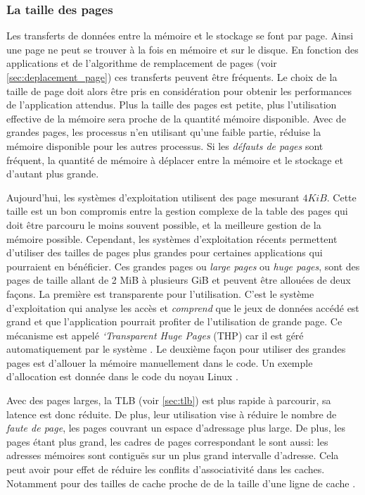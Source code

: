 \subsubsection{La taille des pages}
Les transferts de données entre la mémoire et le stockage se font par page. Ainsi une page ne peut se trouver à la fois en mémoire et sur le disque. En fonction des applications et de l'algorithme de remplacement de pages (voir \autoref{sec:deplacement_page}) ces transferts peuvent être fréquents. Le choix de la taille de page doit alors être pris en considération pour obtenir les performances de l'application attendus.
Plus la taille des pages est petite, plus l'utilisation effective de la mémoire sera proche de la quantité mémoire disponible. Avec de grandes pages, les processus n'en utilisant qu'une faible partie, réduise la mémoire disponible pour les autres processus. Si les \textit{défauts de pages} sont fréquent, la quantité de mémoire à déplacer entre la mémoire et le stockage et d'autant plus grande.

Aujourd'hui, les systèmes d'exploitation utilisent des page mesurant $4 KiB$. Cette taille est un bon compromis entre la gestion complexe de la table des pages qui doit être parcouru le moins souvent possible, et la meilleure gestion de la mémoire possible. 
Cependant, les systèmes d'exploitation récents permettent d'utiliser des tailles de pages plus grandes pour certaines applications qui pourraient en bénéficier. Ces grandes pages ou \textit{large pages} ou \textit{huge pages}, sont des pages de taille allant de 2 MiB à plusieurs GiB et peuvent être allouées de deux façons. La première est transparente pour l'utilisation. C'est le système d'exploitation qui analyse les accès et \textit{comprend} que le jeux de données accédé est grand et que l'application pourrait profiter de l'utilisation de grande page. Ce mécanisme est appelé \textit{`Transparent Huge Pages} (THP) car il est géré automatiquement par le système \cite{LinuxTHP2019}. Le deuxième façon pour utiliser des grandes pages est d'allouer la mémoire manuellement dans le code. Un exemple d'allocation est donnée dans le code du noyau Linux \cite{LinuxHUGE2019}.

Avec des pages larges, la TLB (voir \autoref{sec:tlb}) est plus rapide à parcourir, sa latence est donc réduite. De plus, leur utilisation vise à réduire le nombre de \textit{faute de page}, les pages couvrant un espace d'adressage plus large. De plus, les pages étant plus grand, les cadres de pages correspondant le sont aussi: les adresses mémoires sont contiguës sur un plus grand intervalle d'adresse. Cela peut avoir pour effet de réduire les conflits d'associativité dans les caches. Notamment pour des tailles de cache proche de de la taille d'une ligne de cache \cite{LinuxHUGETEST2019}.






